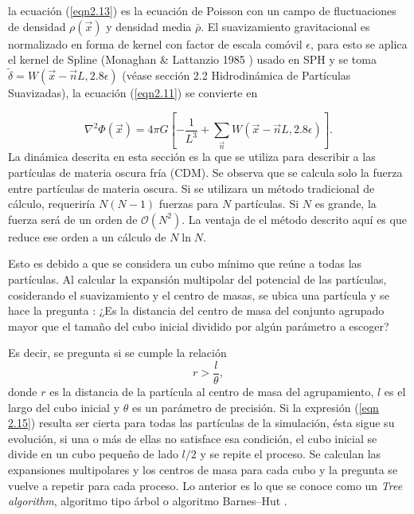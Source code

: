\documentclass[a4paper,openright,12pt]{book}
\begin{document}
la ecuación (\ref{eqn2.13}) es la ecuación de Poisson con un campo de fluctuaciones de densidad $\rho(\vec{x})$ y densidad media $\bar{\rho}$.
El suavizamiento gravitacional es normalizado en forma de kernel con factor de escala comóvil $\epsilon$, para esto se aplica el kernel de Spline (Monaghan \& Lattanzio 1985 \cite{b8.1}) usado en SPH y se toma $\tilde{\delta} = W(\vec{x}-\vec{n}L,2.8\epsilon)$ (véase sección 2.2 Hidrodinámica de Partículas Suavizadas), la ecuación (\ref{eqn2.11}) se convierte en

\begin{equation}
 \nabla^{2}\Phi(\vec{x})
 =
 4\pi G
 \left[
 -\frac{1}{L^{3}}
 +
 \sum_{\vec{n}}W(\vec{x}-\vec{n}L,2.8\epsilon)
 \right].
\end{equation}\label{eqn2.14}
La dinámica descrita en esta sección es la que se utiliza para describir a las partículas de materia oscura fría (CDM). Se observa que se calcula solo la fuerza entre partículas de materia oscura. Si se utilizara un método tradicional de cálculo,  requeriría $N(N-1)$ fuerzas para $N$ partículas. Si $N$ es grande, la fuerza será de un orden de $\mathcal{O}(N^{2})$. La ventaja de el método descrito aquí es que reduce ese orden a un cálculo de $N \ln N$. 

Esto es debido a que se considera un cubo mínimo que reúne a todas las partículas. Al calcular la expansión multipolar del potencial de las partículas, cosiderando el suavizamiento y el centro de masas, se ubica una partícula y se hace la pregunta : ¿Es la distancia del centro de masa del conjunto agrupado mayor que el tamaño del cubo inicial dividido por algún parámetro a escoger?

Es decir, se pregunta si se cumple la relación 
\begin{equation}
r > \frac{l}{\theta}, \label{eqn 2.15}
\end{equation}
donde $r$ es la distancia de la partícula al centro de masa del agrupamiento, $l$ es el largo del cubo inicial y $\theta$ es un parámetro de precisión. Si la expresión (\ref{eqn 2.15}) resulta ser cierta para todas las partículas de la simulación, ésta sigue su evolución, si una o más de ellas no satisface esa condición, el cubo inicial se divide en un cubo pequeño de lado $l/2$ y se repite el proceso. Se calculan las expansiones multipolares y los centros de masa para cada cubo y la pregunta se vuelve a repetir para cada proceso. Lo anterior es lo que se conoce como un \textit{Tree algorithm}, algoritmo tipo árbol o algoritmo Barnes--Hut \cite{b8.2}.
 
\end{document}
